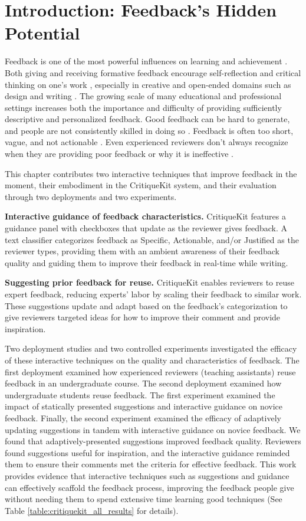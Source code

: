 \section{Introduction: Feedback's Hidden Potential}
Feedback is one of the most powerful influences on learning and achievement \cite{Hattie2007}. Both giving and receiving formative feedback encourage self-reflection and critical thinking on one's work \cite{Li2010, Nicol2006}, especially in creative and open-ended domains such as design and writing \cite{Hattie2007, sadler1989formative}. The growing scale of many educational and professional settings increases both the importance and difficulty of providing sufficiently descriptive and personalized feedback. Good feedback can be hard to generate, and people are not consistently skilled in doing so \cite{kulkarni2013peer, yuan2016}. Feedback is often too short, vague, and not actionable \cite{Kulkarni2015, sommers1980revision, Xiong2012}. Even experienced reviewers don't always recognize when they are providing poor feedback or why it is ineffective \cite{sommers1980revision}.

This chapter contributes two interactive techniques that improve feedback in the moment, their embodiment in the CritiqueKit system, and their evaluation through two deployments and two experiments.

\textbf{Interactive guidance of feedback characteristics.} CritiqueKit features a guidance panel with checkboxes that update as the reviewer gives feedback. A text classifier categorizes feedback as Specific, Actionable, and/or Justified as the reviewer types, providing them with an ambient awareness of their feedback quality and guiding them to improve their feedback in real-time while writing.

\textbf{Suggesting prior feedback for reuse.} CritiqueKit enables reviewers to reuse expert feedback, reducing experts' labor by scaling their feedback to similar work. These suggestions update and adapt based on the feedback's categorization to give reviewers targeted ideas for how to improve their comment and provide inspiration. 

Two deployment studies and two controlled experiments investigated the efficacy of these interactive techniques on the quality and characteristics of feedback. The first deployment examined how experienced reviewers (teaching assistants) reuse feedback in an undergraduate course. The second deployment examined how undergraduate students reuse feedback. The first experiment examined the impact of statically presented suggestions and interactive guidance on novice feedback. Finally, the second experiment examined the efficacy of adaptively updating suggestions in tandem with interactive guidance on novice feedback. We found that adaptively-presented suggestions improved feedback quality. Reviewers found suggestions useful for inspiration, and the interactive guidance reminded them to ensure their comments met the criteria for effective feedback. This work provides evidence that interactive techniques such as suggestions and guidance can effectively scaffold the feedback process, improving the feedback people give without needing them to spend extensive time learning good techniques (See Table \ref{table:critiquekit_all_results} for details).

